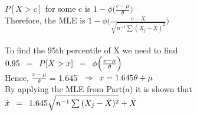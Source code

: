 \\

\\

$P[X > c]$ for some c is $1-\phi{\Big( \frac{c-\mu}{\theta}} \Big)$\\

Therefore, the MLE is $1-\phi{\Big(\frac{c-\bar{X}}{\sqrt{n^{-1} \sum{(X_j - \bar{X})^2}}}} \Big)$\\

\\

To find the 95th percentile of X we need to find\\

$0.95 \enskip = \enskip P[X > x] \enskip = \enskip \phi{\Big( \frac{x- \mu}{\theta}} \Big)$\\

Hence, $\frac{x-\mu}{\theta}$ = 1.645 $\enskip \Rightarrow \enskip x=\text{1.645}\theta + \mu$\\

By applying the MLE from Part(a) it is shown that\\

$\hat{x} \enskip = \enskip \text{1.645} \sqrt{n^{-1} \sum{(X_j - \bar{X})^2}} + \bar{X}$\\